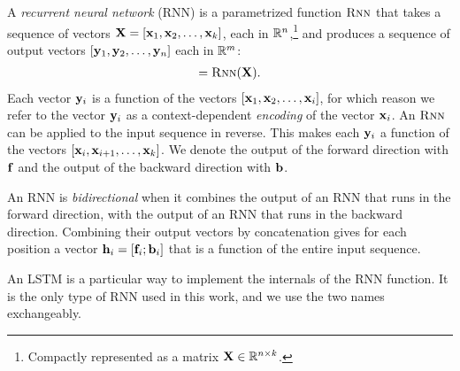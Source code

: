   \begin{definition}{} A \textit{recurrent neural network} (RNN) is a parametrized function $\textsc{Rnn}$ that takes a sequence of vectors $\mathbf{X} = [ \mathbf{x}_1, \mathbf{x}_2, \dots, \mathbf{x}_k ]$, each in $\mathbb{R}^{n}$,\footnote{Compactly represented as a matrix $\mathbf{X} \in \mathbb{R}^{n \times k}$.} and produces a sequence of output vectors $[\mathbf{y}_1, \mathbf{y}_2, \dots,\mathbf{y}_n]$ each in $\mathbb{R}^{m}$:
  \begin{align*}
    [\vecy_1, \vecy_2, \dots, \vecy_k] = \rnn( \mathbf{X} ).
  \end{align*}
  Each vector $\mathbf{y}_i$ is a function of the vectors $[\mathbf{x}_1, \mathbf{x}_2, \dots, \mathbf{x}_i ]$, for which reason we refer to the vector $\mathbf{y}_i$ as a context-dependent \textit{encoding} of the vector $\mathbf{x}_i$. An $\textsc{Rnn}$ can be applied to the input sequence in reverse. This makes each $\mathbf{y}_i$ a function of the vectors $[\mathbf{x}_i, \mathbf{x}_{i+1}, \dots, \mathbf{x}_k ]$. We denote the output of the forward direction with $\mathbf{f}$ and the output of the backward direction with $\mathbf{b}$.
  \end{definition}

  \begin{definition}{} An RNN is \textit{bidirectional} when it combines the output of an RNN that runs in the forward direction, with the output of an RNN that  runs in the backward direction. Combining their output vectors by concatenation gives for each position a vector $\mathbf{h}_i = [ \mathbf{f}_i; \mathbf{b}_i ]$ that is a function of the entire input sequence.
  \end{definition}

  \begin{definition}{} An LSTM \citep{hochreiter1997long} is a particular way to implement the internals of the RNN function. It is the only type of RNN used in this work, and we use the two names exchangeably.
  \end{definition}

